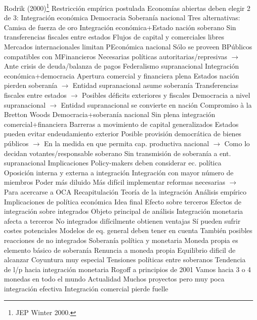 \documentclass{nuevotema}
\begin{document}
\begin{esquemal}
				\4 Rodrik (2000)\footnote{JEP Winter 2000.}
				\4 Restricción empírica postulada
				\4 Economías abiertas deben elegir 2 de 3:
				\4[I] Integración económica
				\4[II] Democracia
				\4[III] Soberanía nacional
				\4 Tres alternativas:
				\4[A] Camisa de fuerza de oro
				\4[] Integración económica+Estado nación soberano
				\4[] Sin transferencias fiscales entre estados
				\4[] Flujos de capital y comerciales libres
				\4[] Mercados internacionales limitan PEconómica nacional
				\4[] Sólo se proveen BPúblicos compatibles con MFinancieros
				\4[] Necesarias políticas autoritarias/represivas
				\4[] $\to$ Ante crisis de deuda/balanza de pagos
				\4[B] Federalismo supranacional
				\4[] Integración económica+democracia
				\4[] Apertura comercial y financiera plena
				\4[] Estados nación pierden soberanía
				\4[] $\to$ Entidad supranacional asume soberanía
				\4[] Transferencias fiscales entre estados
				\4[] $\to$ Posibles déficits exteriores y fiscales
				\4[] Democracia a nivel supranacional
				\4[] $\to$ Entidad supranacional se convierte en nación
				\4[C] Compromiso à la Bretton Woods
				\4[] Democracia+soberanía nacional
				\4[] Sin plena integración comercial+financiera
				\4[] Barreras a movimiento de capital generalizados
				\4[] Estados pueden evitar endeudamiento exterior
				\4[] Posible provisión democrática de bienes públicos
				\4[] $\to$ En la medida en que permita cap. productiva nacional
				\4[] $\to$ Como lo decidan votantes/responsable soberano
				\4[] Sin transmisión de soberanía a ent. supranacional
			\3 Implicaciones
				\4 Policy-makers deben considerar ec. política
				\4[] Oposición interna y externa a integración
				\4 Integración con mayor número de miembros
				\4[] Poder más diluido
				\4[] Más difícil implementar reformas necesarias
				\4[] $\to$ Para acercarse a OCA
	\1[] 
		\2 Recapitulación
			\3 Teoría de la integración
			\3 Análisis empírico
			\3 Implicaciones de política económica
		\2 Idea final
			\3 Efecto sobre terceros
				\4 Efectos de integración sobre integrados
				\4[] Objeto principal de análisis
				\4 Integración monetaria afecta a terceros
				\4[] No integrados difícilmente obtienen ventajas
				\4[] Sí pueden sufrir costes potenciales
				\4[$\then$] Modelos de eq. general deben tener en cuenta
				\4[] También posibles reacciones de no integrados
			\3 Soberanía política y monetaria
				\4 Moneda propia es elemento básico de soberanía
				\4 Renuncia a moneda propia
				\4[] Equilibrio dificil de alcanzar
				\4[] Coyuntura muy especial
				\4[] Tensiones políticas entre soberanos
			\3 Tendencia de l/p hacia integración monetaria
				\4 Rogoff a principios de 2001
				\4[] Vamos hacia 3 o 4 monedas en todo el mundo
				\4 Actualidad
				\4[] Muchos proyectos pero muy poca integración efectiva
				\4[] Integración comercial pierde fuelle
\end{esquemal}
\end{document}
